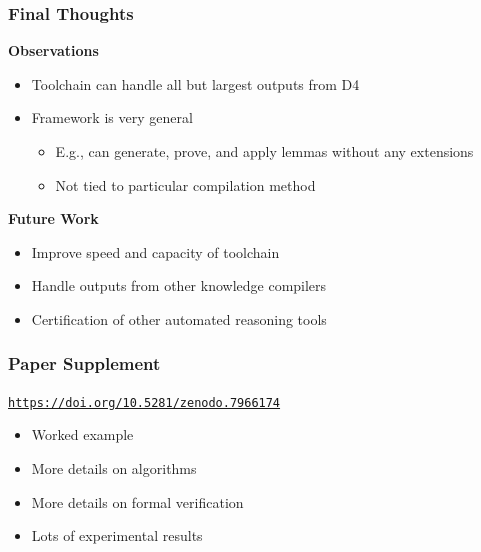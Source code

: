 \documentclass[t,pdf]{beamer}
\newcommand{\cref}[2]{\href{#1}{\color{blue}#2}}
\newcommand{\hcref}[1]{\cref{#1}{\small\tt #1}}
\newcommand{\bitem}{\item[$\bullet$]}
\begin{document}
\begin{frame}
  \frametitle{Final Thoughts}

  \medskip

  {\bf Observations}
  \begin{itemize}
  \item Toolchain can handle all but largest outputs from D4
  \item Framework is very general
    \begin{itemize}
      \bitem E.g., can generate, prove, and apply lemmas without any extensions
      \bitem Not tied to particular compilation method
    \end{itemize}
  \end{itemize}

  \medskip

  {\bf Future Work}
  \begin{itemize}
  \item Improve speed and capacity of toolchain
  \item Handle outputs from other knowledge compilers
  \item Certification of other automated reasoning tools
  \end{itemize}

\end{frame}

\begin{frame}
\frametitle{Paper Supplement}

\bigskip
\begin{center}
 \hcref{https://doi.org/10.5281/zenodo.7966174}
\end{center}

\bigskip
\begin{itemize}
\item Worked example
\item More details on algorithms
\item More details on formal verification
\item Lots of experimental results
\end{itemize}

\end{frame}
\end{document}
